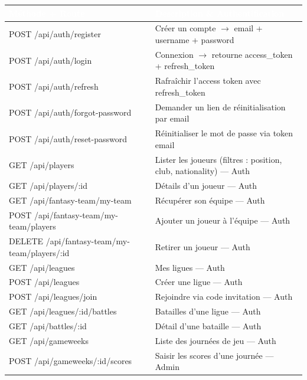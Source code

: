 \begin{table}[H]
\centering\small
    \begin{tabularx}{\linewidth}{|l|X|}
        \hline
        \rowcolor{emsigreen}\textcolor{white}{\textbf{Méthode + Route}} & \textcolor{white}{\textbf{Description \& Authentification}} \\
        \hline
        POST /api/auth/register & Créer un compte $\rightarrow$ email + username + password \\
        \hline
        POST /api/auth/login & Connexion $\rightarrow$ retourne access\_token + refresh\_token \\
        \hline
        POST /api/auth/refresh & Rafraîchir l'access token avec refresh\_token \\
        \hline
        POST /api/auth/forgot-password & Demander un lien de réinitialisation par email \\
        \hline
        POST /api/auth/reset-password & Réinitialiser le mot de passe via token email \\
        \hline
        GET /api/players & Lister les joueurs (filtres : position, club, nationality) --- Auth \\
        \hline
        GET /api/players/:id & Détails d'un joueur --- Auth \\
        \hline
        GET /api/fantasy-team/my-team & Récupérer son équipe --- Auth \\
        \hline
        POST /api/fantasy-team/my-team/players & Ajouter un joueur à l'équipe --- Auth \\
        \hline
        DELETE /api/fantasy-team/my-team/players/:id & Retirer un joueur --- Auth \\
        \hline
        GET /api/leagues & Mes ligues --- Auth \\
        \hline
        POST /api/leagues & Créer une ligue --- Auth \\
        \hline
        POST /api/leagues/join & Rejoindre via code invitation --- Auth \\
        \hline
        GET /api/leagues/:id/battles & Batailles d'une ligue --- Auth \\
        \hline
        GET /api/battles/:id & Détail d'une bataille --- Auth \\
        \hline
        GET /api/gameweeks & Liste des journées de jeu --- Auth \\
        \hline
        POST /api/gameweeks/:id/scores & Saisir les scores d'une journée --- Admin \\

\end{tabularx}
\end{table}
